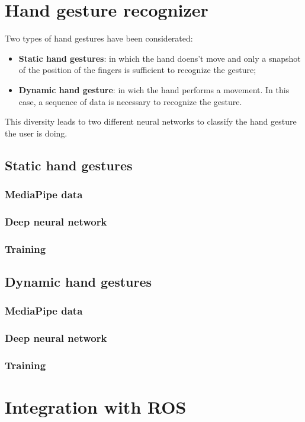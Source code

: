 \documentclass[../thesis.tex]{subfiles}
\begin{document}
\section{Hand gesture recognizer}
Two types of hand gestures have been considerated:
\begin{itemize}
    \item \textbf{Static hand gestures}: in which the hand doens't move and only a snapshot of the position of the fingers is sufficient to recognize the gesture;
    \item \textbf{Dynamic hand gesture}: in wich the hand performs a movement. In this case, a sequence of data is necessary to recognize the gesture. 
\end{itemize}
This diversity leads to two different neural networks to classify the hand gesture the user is doing.

\subsection{Static hand gestures}

\subsubsection{MediaPipe data}

\subsubsection{Deep neural network}

\subsubsection{Training}

\subsection{Dynamic hand gestures}

\subsubsection{MediaPipe data}

\subsubsection{Deep neural network}

\subsubsection{Training}

\section{Integration with ROS}
\end{document}
